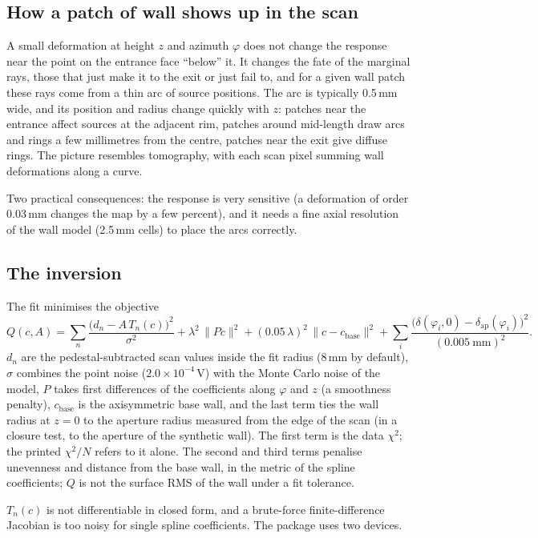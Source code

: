 \documentclass[11pt,a4paper]{article}
\begin{document}
\subsection{How a patch of wall shows up in the scan}

A small deformation at height $z$ and azimuth $\varphi$ does not change the response near the point
on the entrance face ``below'' it. It changes the fate of the marginal rays, those that just make it
to the exit or just fail to, and for a given wall patch these rays come from a thin arc of source
positions. The arc is typically 0.5\,mm wide, and its position and radius change quickly with $z$:
patches near the entrance affect sources at the adjacent rim, patches around mid-length draw arcs
and rings a few millimetres from the centre, patches near the exit give diffuse rings. The picture
resembles tomography, with each scan pixel summing wall deformations along a curve.

Two practical consequences: the response is very sensitive (a deformation of order 0.03\,mm changes
the map by a few percent), and it needs a fine axial resolution of the wall model (2.5\,mm cells)
to place the arcs correctly.

\subsection{The inversion}
\label{sec:inversion}

The fit minimises the objective
\[
  Q(c,A) = \sum_n \frac{\big(d_n-A\,T_n(c)\big)^2}{\sigma^2}
  + \lambda^2\,\lVert P c\rVert^2 + (0.05\,\lambda)^2\,\lVert c-c_\mathrm{base}\rVert^2
  + \sum_i \frac{\big(\delta(\varphi_i,0)-\delta_\mathrm{ap}(\varphi_i)\big)^2}{(0.005\ \mathrm{mm})^2}.
\]
$d_n$ are the pedestal-subtracted scan values inside the fit radius (8\,mm by default), $\sigma$
combines the point noise ($2.0\times10^{-4}$\,V) with the Monte Carlo noise of the model, $P$ takes
first differences of the coefficients along $\varphi$ and $z$ (a smoothness penalty), $c_\mathrm{base}$
is the axisymmetric base wall, and the last term ties the wall radius at $z=0$ to the aperture
radius measured from the edge of the scan (in a closure test, to the aperture of the synthetic wall).
The first term is the data $\chi^2$; the printed $\chi^2/N$ refers to it alone. The second and third
terms penalise unevenness and distance from the base wall, in the metric of the spline coefficients;
$Q$ is not the surface RMS of the wall under a fit tolerance.

$T_n(c)$ is not differentiable in closed form, and a brute-force finite-difference Jacobian is too
noisy for single spline coefficients. The package uses two devices.
\end{document}

